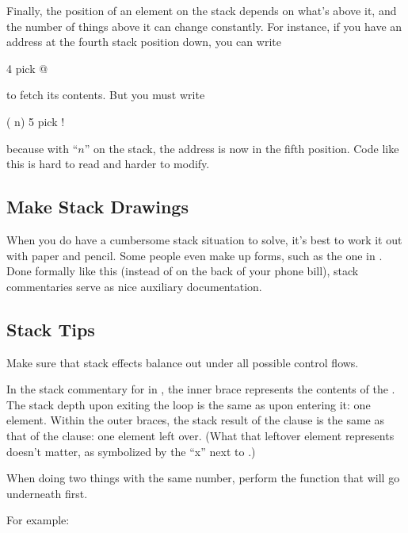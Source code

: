 Finally, the position of an element on the stack depends on what's
above it, and the number of things above it can change constantly. For
instance, if you have an address at the fourth stack position down, you can
write

\begin{Code}
4 pick @
\end{Code}
to fetch its contents. But you must write

\begin{Code}
( n) 5 pick !
\end{Code}
because with ``$n$'' on the stack, the address is now in the fifth position.
Code like this is hard to read and harder to modify.%
%
%
%

\subsection{Make Stack Drawings}%

When you do have a cumbersome stack situation to solve, it's best to work
it out with paper and pencil. Some people even make up forms, such as the
one in . Done formally like this (instead of on the back of your
phone bill), stack commentaries serve as nice auxiliary documentation.

\subsection{Stack Tips}

\begin{tip}
Make sure that stack effects balance out under all possible control flows.
\end{tip}
In the stack commentary for  in , the inner
brace represents the contents of the . The stack
depth upon exiting the loop is the same as upon entering it: one element.
Within the outer braces, the stack result of the  clause is the
same as that of the  clause: one element left over. (What
that leftover element represents doesn't matter, as symbolized by the
``x'' next to .)



\begin{tip}
When doing two things with the same number, perform the function that
will go underneath first.
\end{tip}
For example:

